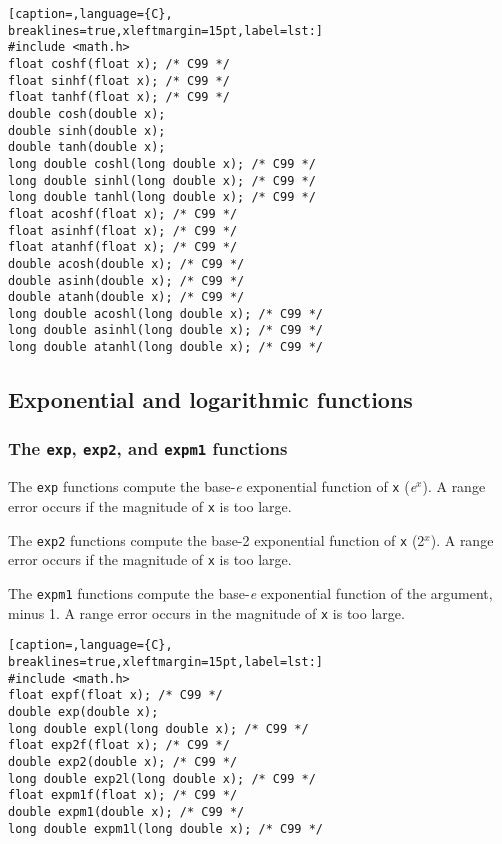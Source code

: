 \lstset{basicstyle=\scriptsize, numbers=left, captionpos=b, tabsize=4}
\begin{lstlisting}[caption=,language={C},
breaklines=true,xleftmargin=15pt,label=lst:]
#include <math.h>
float coshf(float x); /* C99 */
float sinhf(float x); /* C99 */
float tanhf(float x); /* C99 */
double cosh(double x); 
double sinh(double x);
double tanh(double x);
long double coshl(long double x); /* C99 */
long double sinhl(long double x); /* C99 */
long double tanhl(long double x); /* C99 */
float acoshf(float x); /* C99 */
float asinhf(float x); /* C99 */
float atanhf(float x); /* C99 */
double acosh(double x); /* C99 */
double asinh(double x); /* C99 */
double atanh(double x); /* C99 */
long double acoshl(long double x); /* C99 */
long double asinhl(long double x); /* C99 */
long double atanhl(long double x); /* C99 */
\end{lstlisting}

\subsection{Exponential and logarithmic functions}
\subsubsection{The \texttt{exp}, \texttt{exp2}, and \texttt{expm1} functions}
The \texttt{exp} functions compute the base-\emph{e} exponential function of
\texttt{x} (\emph{e}\(^{x}\)). A range error occurs if the magnitude of
\texttt{x} is too large.

The \texttt{exp2} functions compute the base-2 exponential function of
\texttt{x} (2\(^{x}\)). A range error occurs if the magnitude of \texttt{x} is
too large.

The \texttt{expm1} functions compute the base-\emph{e} exponential function of
the argument, minus 1. A range error occurs in the magnitude of \texttt{x} is
too large.

\lstset{basicstyle=\scriptsize, numbers=left, captionpos=b, tabsize=4}
\begin{lstlisting}[caption=,language={C},
breaklines=true,xleftmargin=15pt,label=lst:]
#include <math.h>
float expf(float x); /* C99 */
double exp(double x);
long double expl(long double x); /* C99 */
float exp2f(float x); /* C99 */
double exp2(double x); /* C99 */
long double exp2l(long double x); /* C99 */
float expm1f(float x); /* C99 */
double expm1(double x); /* C99 */
long double expm1l(long double x); /* C99 */
\end{lstlisting}

